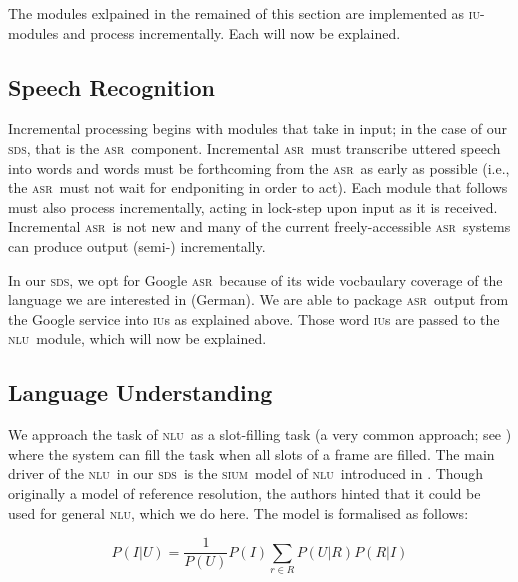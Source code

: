 \documentclass[11pt]{article}
\newcommand{\sds}[0]{\textsc{sds}}
\newcommand{\nlu}[0]{\textsc{nlu}}
\newcommand{\sium}[0]{\textsc{sium}}
\newcommand{\asr}[0]{\textsc{asr}}
\newcommand{\iu}[0]{\textsc{iu}}
\begin{document}
The modules exlpained in the remained of this section are implemented as \iu-modules and process incrementally. Each will now be explained. 

\subsection{Speech Recognition}

Incremental processing begins with modules that take in input; in the case of our \sds, that is the \asr\ component. Incremental \asr\ must transcribe uttered speech into words and words must be forthcoming from the \asr\ as early as possible (i.e., the \asr\ must not wait for endponiting in order to act). Each module that follows must also process incrementally, acting in lock-step upon input as it is received. Incremental \asr\ is not new \cite{baumannetal2009:naacl} and many of the current freely-accessible \asr\ systems can produce output (semi-) incrementally. 

In our \sds, we opt for Google \asr\ because of its wide vocbaulary coverage of the language we are interested in (German). We are able to package \asr\ output from the Google service into \iu s as explained above. Those word \iu s are passed to the \nlu\ module, which will now be explained. 

\subsection{Language Understanding}

We approach the task of \nlu\ as a slot-filling task (a very common approach; see \cite{Tur2012}) where the system can fill the task when all slots of a frame are filled. The main driver of the \nlu\ in our \sds\ is the \sium\ model of \nlu\ introduced in \cite{Kennington2013a}. Though originally a model of reference resolution, the authors hinted that it could be used for general \nlu, which we do here. The model is formalised as follows:

\begin{center}
\begin{equation}
   P(I|U) = \frac{1}{P(U)} P(I)\sum_{r\in R} P(U|R)P(R|I) 
\label{eq:disc1}
\end{equation}
\end{center}
\end{document}
